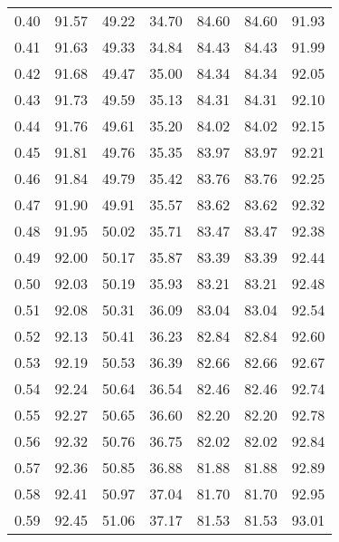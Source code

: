 \begin{tabular}{|c|c|c|c|c|c|c|}
      0.40 &     91.57 &     49.22 &      34.70 &   84.60 &      84.60 &         91.93 \\
      0.41 &     91.63 &     49.33 &      34.84 &   84.43 &      84.43 &         91.99 \\
      0.42 &     91.68 &     49.47 &      35.00 &   84.34 &      84.34 &         92.05 \\
      0.43 &     91.73 &     49.59 &      35.13 &   84.31 &      84.31 &         92.10 \\
      0.44 &     91.76 &     49.61 &      35.20 &   84.02 &      84.02 &         92.15 \\
      0.45 &     91.81 &     49.76 &      35.35 &   83.97 &      83.97 &         92.21 \\
      0.46 &     91.84 &     49.79 &      35.42 &   83.76 &      83.76 &         92.25 \\
      0.47 &     91.90 &     49.91 &      35.57 &   83.62 &      83.62 &         92.32 \\
      0.48 &     91.95 &     50.02 &      35.71 &   83.47 &      83.47 &         92.38 \\
      0.49 &     92.00 &     50.17 &      35.87 &   83.39 &      83.39 &         92.44 \\
      0.50 &     92.03 &     50.19 &      35.93 &   83.21 &      83.21 &         92.48 \\
      0.51 &     92.08 &     50.31 &      36.09 &   83.04 &      83.04 &         92.54 \\
      0.52 &     92.13 &     50.41 &      36.23 &   82.84 &      82.84 &         92.60 \\
      0.53 &     92.19 &     50.53 &      36.39 &   82.66 &      82.66 &         92.67 \\
      0.54 &     92.24 &     50.64 &      36.54 &   82.46 &      82.46 &         92.74 \\
      0.55 &     92.27 &     50.65 &      36.60 &   82.20 &      82.20 &         92.78 \\
      0.56 &     92.32 &     50.76 &      36.75 &   82.02 &      82.02 &         92.84 \\
      0.57 &     92.36 &     50.85 &      36.88 &   81.88 &      81.88 &         92.89 \\
      0.58 &     92.41 &     50.97 &      37.04 &   81.70 &      81.70 &         92.95 \\
      0.59 &     92.45 &     51.06 &      37.17 &   81.53 &      81.53 &         93.01 \\

\end{tabular}
